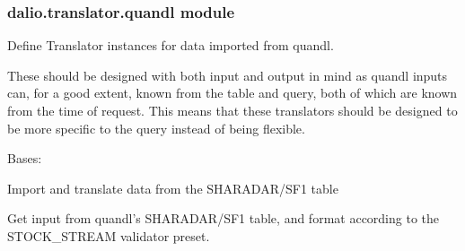 \documentclass[letterpaper,10pt,english]{sphinxmanual}
\begin{document}
\subsubsection{dalio.translator.quandl module}
\label{\detokenize{dalio.translator:module-dalio.translator.quandl}}\label{\detokenize{dalio.translator:dalio-translator-quandl-module}}
Define Translator instances for data imported from quandl.

These should be designed with both input and output in mind as quandl inputs
can, for a good extent, known from the table and query, both of which are
known from the time of request. This means that these translators should be
designed to be more specific to the query instead of being flexible.

\begin{fulllineitems}
\label{\detokenize{dalio.translator:dalio.translator.quandl.QuandlSharadarSF1Translator}}
Bases: {\hyperref[\detokenize{dalio.translator:dalio.translator.translator.Translator}]{}}

Import and translate data from the SHARADAR/SF1 table

\begin{fulllineitems}
\label{\detokenize{dalio.translator:dalio.translator.quandl.QuandlSharadarSF1Translator.run}}
Get input from quandl’s SHARADAR/SF1 table, and format
according to the STOCK\_STREAM validator preset.

\end{fulllineitems}


\begin{fulllineitems}
\label{\detokenize{dalio.translator:dalio.translator.quandl.QuandlSharadarSF1Translator.translations}}
\end{fulllineitems}


\end{fulllineitems}
\end{document}
